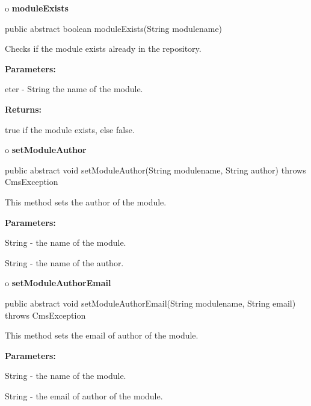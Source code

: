 o {\bf moduleExists} 

\begin{PRE}
 public abstract boolean moduleExists(String modulename)
\end{PRE}

\begin{description}
\htmlDD Checks if the module exists already in the repository. 

\begin{description}
\item {\bf Parameters:}  

eter - String the name of the module.  
\item {\bf Returns:}  

true if the module exists, else false.  
\end{description}

\end{description}

o {\bf setModuleAuthor} 

\begin{PRE}
 public abstract void setModuleAuthor(String modulename,
                                      String author) throws CmsException
\end{PRE}

\begin{description}
\htmlDD This method sets the author of the module. 

\begin{description}
\item {\bf Parameters:}  

String - the name of the module.  

String - the name of the author.  
\end{description}

\end{description}

o {\bf setModuleAuthorEmail} 

\begin{PRE}
 public abstract void setModuleAuthorEmail(String modulename,
                                           String email) throws CmsException
\end{PRE}

\begin{description}
\htmlDD This method sets the email of author of the module. 

\begin{description}
\item {\bf Parameters:}  

String - the name of the module.  

String - the email of author of the module.  
\end{description}

\end{description}

